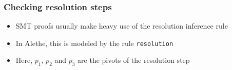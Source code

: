 \documentclass[usepdftitle=false,aspectratio=169]{beamer}
\newcommand\vitem{\vfill\item}
\begin{document}
\begin{frame}
  \frametitle{Checking resolution steps}
  \begin{itemize}
    \item SMT proofs usually make heavy use of the resolution inference rule
    \vitem In Alethe, this is modeled by the rule \texttt{resolution}
    \vfill
    \begin{prooftree}
    \end{prooftree}
    \pause
    \vitem Here, $p_1$, $p_2$ and $p_3$ are the pivots of the resolution
    step
  \end{itemize}
\end{frame}
\end{document}
